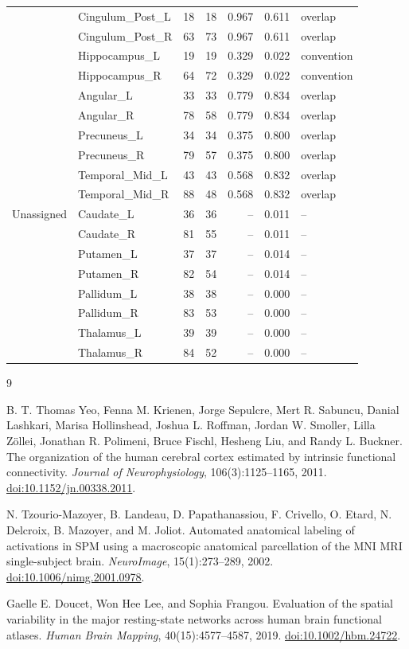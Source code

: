 \documentclass[a4paper,10pt]{article}
\begin{document}
\begin{longtable}{lllrrrl}
 & Cingulum\_Post\_L & 18 & 18 & 0.967 & 0.611 & overlap \\
 & Cingulum\_Post\_R & 63 & 73 & 0.967 & 0.611 & overlap \\
 & Hippocampus\_L & 19 & 19 & 0.329 & 0.022 & convention \\
 & Hippocampus\_R & 64 & 72 & 0.329 & 0.022 & convention \\
 & Angular\_L & 33 & 33 & 0.779 & 0.834 & overlap \\
 & Angular\_R & 78 & 58 & 0.779 & 0.834 & overlap \\
 & Precuneus\_L & 34 & 34 & 0.375 & 0.800 & overlap \\
 & Precuneus\_R & 79 & 57 & 0.375 & 0.800 & overlap \\
 & Temporal\_Mid\_L & 43 & 43 & 0.568 & 0.832 & overlap \\
 & Temporal\_Mid\_R & 88 & 48 & 0.568 & 0.832 & overlap \\
\midrule
Unassigned & Caudate\_L & 36 & 36 & -- & 0.011 & -- \\
 & Caudate\_R & 81 & 55 & -- & 0.011 & -- \\
 & Putamen\_L & 37 & 37 & -- & 0.014 & -- \\
 & Putamen\_R & 82 & 54 & -- & 0.014 & -- \\
 & Pallidum\_L & 38 & 38 & -- & 0.000 & -- \\
 & Pallidum\_R & 83 & 53 & -- & 0.000 & -- \\
 & Thalamus\_L & 39 & 39 & -- & 0.000 & -- \\
 & Thalamus\_R & 84 & 52 & -- & 0.000 & -- \\
\end{longtable}
\endgroup

\begin{thebibliography}{9}

B. T. Thomas Yeo, Fenna M. Krienen, Jorge Sepulcre, Mert R. Sabuncu, Danial Lashkari, Marisa Hollinshead, Joshua L. Roffman, Jordan W. Smoller, Lilla Z\"{o}llei, Jonathan R. Polimeni, Bruce Fischl, Hesheng Liu, and Randy L. Buckner.
The organization of the human cerebral cortex estimated by intrinsic functional connectivity.
\emph{Journal of Neurophysiology}, 106(3):1125--1165, 2011.
\href{https://doi.org/10.1152/jn.00338.2011}{doi:10.1152/jn.00338.2011}.

N. Tzourio-Mazoyer, B. Landeau, D. Papathanassiou, F. Crivello, O. Etard, N. Delcroix, B. Mazoyer, and M. Joliot.
Automated anatomical labeling of activations in SPM using a macroscopic anatomical parcellation of the MNI MRI single-subject brain.
\emph{NeuroImage}, 15(1):273--289, 2002.
\href{https://doi.org/10.1006/nimg.2001.0978}{doi:10.1006/nimg.2001.0978}.

Gaelle E. Doucet, Won Hee Lee, and Sophia Frangou.
Evaluation of the spatial variability in the major resting-state networks across human brain functional atlases.
\emph{Human Brain Mapping}, 40(15):4577--4587, 2019.
\href{https://doi.org/10.1002/hbm.24722}{doi:10.1002/hbm.24722}.

\end{thebibliography}
\end{document}
